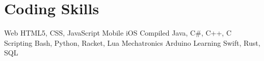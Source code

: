 \documentclass[11pt,a4paper,sans]{moderncv}        %
\begin{document}
\section{Coding Skills}	%
\cvdoubleitem
{Web}	                {HTML5, CSS, JavaScript}
{Mobile}	        {iOS}
\cvdoubleitem
{Compiled}	        {Java, C\#, C++, C}
{Scripting}		{Bash, Python, Racket, Lua}
\cvdoubleitem
{Mechatronics}	        {Arduino}
{Learning}		{Swift, Rust, SQL}
\end{document}
